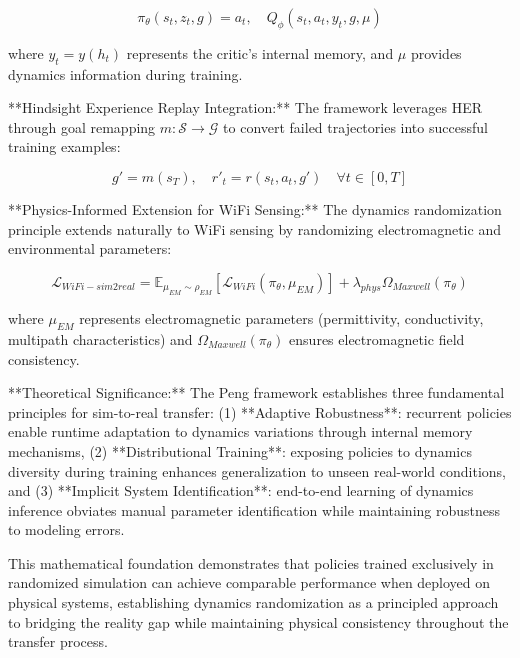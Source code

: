 \documentclass[journal]{IEEEtran}
\begin{document}
{\begin{equation}
\pi_\theta(s_t, z_t, g) = a_t, \quad Q_\phi(s_t, a_t, y_t, g, \mu)
\label{eq:peng_rdpg_formulation}
\end{equation}

where $y_t = y(h_t)$ represents the critic's internal memory, and $\mu$ provides dynamics information during training.

**Hindsight Experience Replay Integration:**
The framework leverages HER through goal remapping $m: \mathcal{S} \rightarrow \mathcal{G}$ to convert failed trajectories into successful training examples:

\begin{equation}
g' = m(s_T), \quad r'_t = r(s_t, a_t, g') \quad \forall t \in [0, T]
\label{eq:peng_her_remapping}
\end{equation}

**Physics-Informed Extension for WiFi Sensing:**
The dynamics randomization principle extends naturally to WiFi sensing by randomizing electromagnetic and environmental parameters:

\begin{equation}
\mathcal{L}_{WiFi-sim2real} = \mathbb{E}_{\mu_{EM} \sim \rho_{EM}} \left[ \mathcal{L}_{WiFi}(\pi_\theta, \mu_{EM}) \right] + \lambda_{phys} \Omega_{Maxwell}(\pi_\theta)
\label{eq:peng_wifi_extension}
\end{equation}

where $\mu_{EM}$ represents electromagnetic parameters (permittivity, conductivity, multipath characteristics) and $\Omega_{Maxwell}(\pi_\theta)$ ensures electromagnetic field consistency.

**Theoretical Significance:**
The Peng framework establishes three fundamental principles for sim-to-real transfer: (1) **Adaptive Robustness**: recurrent policies enable runtime adaptation to dynamics variations through internal memory mechanisms, (2) **Distributional Training**: exposing policies to dynamics diversity during training enhances generalization to unseen real-world conditions, and (3) **Implicit System Identification**: end-to-end learning of dynamics inference obviates manual parameter identification while maintaining robustness to modeling errors.

This mathematical foundation demonstrates that policies trained exclusively in randomized simulation can achieve comparable performance when deployed on physical systems, establishing dynamics randomization as a principled approach to bridging the reality gap while maintaining physical consistency throughout the transfer process.

}
\end{document}
